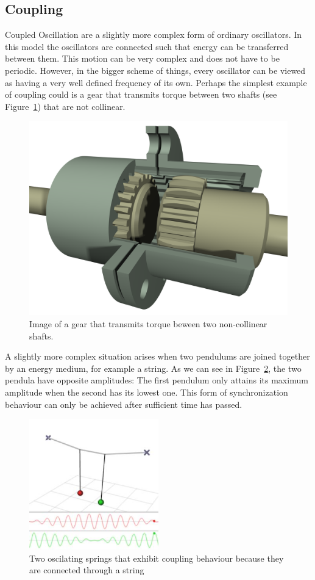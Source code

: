 \subsection{Coupling}
Coupled Oscillation are a slightly more complex form of ordinary oscillators. In this model the oscillators are connected such that energy can be transferred between them. This motion can be very complex and does not have to be periodic. However, in the bigger scheme of things, every oscillator can be viewed as having a very well defined frequency of its own. Perhaps the simplest example of coupling could is a gear that transmits torque between two shafts (see Figure~\ref{fig:intro_gear}) that are not collinear. 

\begin{figure}[h]
  \centering
  \includegraphics[width=0.5\linewidth]{imgs/gear}
  \caption{Image of a gear that transmits torque beween two non-collinear shafts. }
  \label{fig:intro_gear}
\end{figure}

A slightly more complex situation arises when two pendulums are joined together by an energy medium, for example a string. As we can see in Figure~\ref{fig:intro_couple}, the two pendula have opposite amplitudes: The first pendulum only attains its maximum amplitude when the second has its lowest one. This form of synchronization behaviour can only be achieved after sufficient time has passed. 

\begin{figure}[h]
\centering
\includegraphics[width=0.5\textwidth]{imgs/couple}
\caption{Two oscilating springs that exhibit coupling behaviour because they are connected through a string}
\label{fig:intro_couple}
\end{figure}

